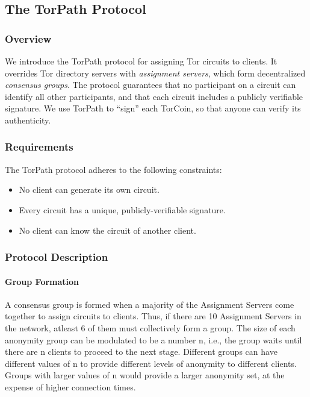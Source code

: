 \subsection{The TorPath Protocol}

\subsubsection{Overview}

We introduce the TorPath protocol for assigning Tor circuits to clients. It
overrides Tor directory servers with \textit{assignment servers}, which form
decentralized \textit{consensus groups}. The protocol guarantees that no
participant on a circuit can identify all other participants, and that each
circuit includes a publicly verifiable signature. We use TorPath to ``sign''
each TorCoin, so that anyone can verify its authenticity.

\subsubsection{Requirements}

The TorPath protocol adheres to the following constraints:

\begin{itemize}   
\item No client can generate its own circuit.   
\item Every circuit has a unique, publicly-verifiable signature.   
\item No client can know the circuit of another client. 
\end{itemize}

\subsubsection{Protocol Description}

\paragraph{Group Formation}

A consensus group is formed when a majority of the Assignment Servers come
together to assign circuits to clients. Thus, if there are 10 Assignment Servers
in the network, atleast 6 of them must collectively form a group.  The size of
each anonymity group can be modulated to be a number n, i.e., the group waits
until there are n clients to proceed to the next stage. Different groups can
have different values of n to provide different levels of anonymity to different
clients. Groups with larger values of n would provide a larger anonymity set, at
the expense of higher connection times.


